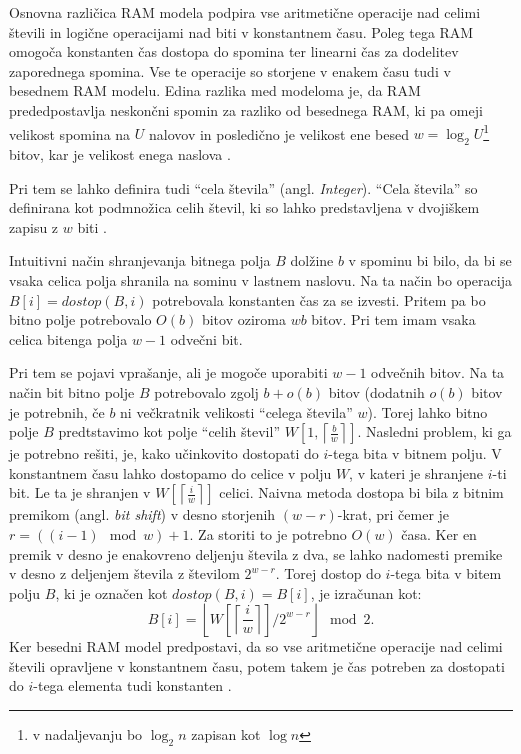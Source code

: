 Osnovna različica RAM modela podpira vse aritmetične operacije nad celimi števili in logične operacijami nad biti v konstantnem času. Poleg tega RAM omogoča konstanten čas dostopa do spomina ter linearni čas za dodelitev zaporednega spomina. Vse te operacije so storjene v enakem času tudi v besednem RAM modelu. Edina razlika med modeloma je, da RAM prededpostavlja neskončni spomin za razliko od besednega RAM, ki pa omeji velikost spomina na $U$ nalovov in posledično je velikost ene besed $w=\log_2 U$\footnote{v nadaljevanju bo $\log_2 n$ zapisan kot $\log n$} bitov, kar je velikost enega naslova \cite{Fredman1990,Morin2013}.

Pri tem se lahko definira tudi \enquote{cela števila} (angl. \textit{Integer}). \enquote{Cela števila} so definirana kot podmnožica celih števil, ki so lahko predstavljena v dvojiškem zapisu z $w$ biti \cite{Navarro2016}.

Intuitivni način shranjevanja bitnega polja $B$ dolžine $b$ v spominu bi bilo, da bi se vsaka celica polja shranila na sominu v lastnem naslovu. Na ta način bo operacija $B[i]=dostop(B,i)$ potrebovala konstanten čas za se izvesti. Pritem pa bo bitno polje potrebovalo $O(b)$ bitov oziroma $wb$ bitov. Pri tem imam vsaka celica bitenga polja $w-1$ odvečni bit. 

Pri tem se pojavi vprašanje, ali je mogoče uporabiti $w-1$ odvečnih bitov. Na ta način bit bitno polje $B$ potrebovalo zgolj $b+o(b)$ bitov (dodatnih $o(b)$ bitov je potrebnih, če $b$ ni večkratnik velikosti \enquote{celega števila} $w$). Torej lahko bitno polje $B$ predtstavimo kot polje \enquote{celih števil} $W\left[1,\left\lceil\frac{b}{w}\right\rceil\right]$. Nasledni problem, ki ga je potrebno rešiti, je, kako učinkovito dostopati do $i$-tega bita v bitnem polju. V konstantnem času lahko dostopamo do celice v polju $W$, v kateri je shranjene $i$-ti bit. Le ta je shranjen v $W\left[\left\lceil\frac{i}{w}\right\rceil\right]$ celici. Naivna metoda dostopa bi bila z bitnim premikom (angl. \textit{bit shift}) v desno storjenih $(w-r)$-krat, pri čemer je $r=((i-1)\mod{w}) +1$. Za storiti to je potrebno $O(w)$ časa. Ker en premik v desno je enakovreno deljenju števila z dva, se lahko nadomesti premike v desno z deljenjem števila z številom $2^{w-r}$.
Torej dostop do $i$-tega bita v bitem polju $B$, ki je označen kot $\textit{dostop}(B,i)=B[i]$, je izračunan kot:
$$
    B[i]=\left\lfloor W\left[\left\lceil\frac{i}{w}\right\rceil\right]/2^{w-r}\right\rfloor \mod{2}.
$$
Ker besedni RAM model predpostavi, da so vse aritmetične operacije nad celimi števili opravljene v konstantnem času, potem takem je čas potreben za dostopati do $i$-tega elementa tudi konstanten \cite{Navarro2016}.

